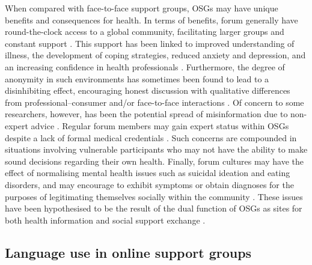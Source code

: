 



When compared with face\hyp{}to\hyp{}face support groups, \glspl{OSG} may have unique benefits and consequences for  health. In terms of benefits, forum  generally have round\hyp{}the\hyp{}clock access to a global community, facilitating larger groups and constant support \cite{stommel_online_2010,stommel_use_2011}. This support has been linked to improved understanding of illness, the development of coping strategies, reduced anxiety and depression, and an increasing confidence in health professionals \cite{mulveen_interpretative_2006,swan_sharing_2010,manchaiah_use_2013,yao_impact_2015}. Furthermore, the degree of anonymity in such environments has sometimes been found to lead to a disinhibiting effect, encouraging honest discussion \cite{mo_are_2013} with qualitative differences from professional--consumer and\slash or face\hyp{}to\hyp{}face interactions \cite{maclean_forum77:_2015}. Of concern to some researchers, however, has been the potential spread of misinformation due to non\hyp{}expert advice \cite{ziebland_how_2004}. Regular \gls{forum} \glspl{member} may gain expert status within \glspl{OSG} despite a lack of formal medical credentials \cite{hardey_doctor_1999,thompson_credibility_2012}. Such concerns are compounded in situations involving vulnerable participants who may not have the ability to make sound decisions regarding their own health. Finally, \gls{forum} cultures may have the effect of normalising mental health issues such as suicidal ideation and eating disorders, and may encourage  to exhibit symptoms or obtain diagnoses for the purposes of legitimating themselves socially within the community \cite{horne_doing_2009,vayreda_social_2009}. These issues have been hypothesised to be the result of the dual function of \glspl{OSG} as sites for both health information and social support exchange \cite{nambisan_information_2011,attard_thematic_2012}.

\subsection{Language use in online support groups} \label{sect:intro-lang-in-osg}

